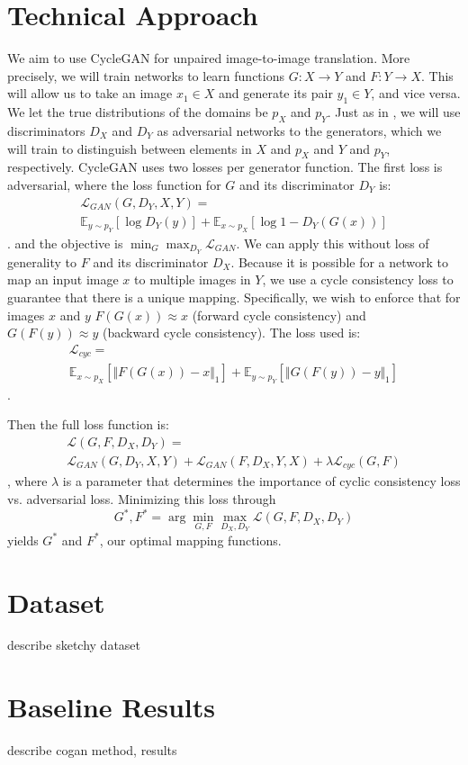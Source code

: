 \documentclass[10pt,twocolumn,letterpaper]{article}
\begin{document}
\section{Technical Approach}
We aim to use CycleGAN \cite{cycleGAN} for unpaired image-to-image translation.
More precisely, we will train networks to learn functions $G : X \rightarrow Y$ and $F: Y \rightarrow X$.
This will allow us to take an image $x_1 \in X$ and generate its pair $y_1 \in Y$, and vice versa.
We let the true distributions of the domains be $p_X$ and $p_Y$.
Just as in \cite{gan}, we will use discriminators $D_X$ and $D_Y$ as adversarial networks to the generators, which we will train to distinguish between elements in $X$ and $p_X$ and $Y$ and $p_Y$, respectively.
CycleGAN uses two losses per generator function.
The first loss is adversarial, where the loss function for $G$ and its discriminator $D_Y$ is:
\begin{multline}
\displaystyle \mathcal{L}_{GAN}(G, D_Y, X, Y) = \\
\mathbb{E}_{y \sim p_Y}[\log{D_Y(y)}]
+ \mathbb{E}_{x \sim p_X}[\log{1 - D_Y(G(x))}]
\end{multline}.
and the objective is $\displaystyle \min_{G} \max_{D_Y} \mathcal{L}_{GAN}$.
We can apply this without loss of generality to $F$ and its discriminator $D_X$.
Because it is possible for a network to map an input image $x$ to multiple images in $Y$, we use a cycle consistency loss to guarantee that there is a unique mapping.
Specifically, we wish to enforce that for images $x$ and $y$ $F(G(x)) \approx x$ (forward cycle consistency) and $G(F(y)) \approx y$ (backward cycle consistency).
The loss used is:
\begin{multline}
\displaystyle \mathcal{L}_{cyc} = \\
\mathbb{E}_{x \sim p_X}[\Vert{F(G(x)) - x}\Vert_1]
+ \mathbb{E}_{y \sim p_Y}[\Vert{G(F(y)) - y}\Vert_1]
\end{multline}.

Then the full loss function is:
\begin{multline}
\displaystyle \mathcal{L}(G, F, D_X, D_Y) = \\
\mathcal{L}_{GAN}(G, D_Y, X, Y)
+ \mathcal{L}_{GAN}(F, D_X, Y, X)
+ \lambda\mathcal{L}_{cyc}(G, F)
\end{multline},
where $\lambda$ is a parameter that determines the importance of cyclic consistency loss vs. adversarial loss.
Minimizing this loss through
\begin{equation}
\displaystyle G^*, F^* = \arg\min_{G, F}\max_{D_X, D_Y} \mathcal{L}(G, F, D_X, D_Y)
\end{equation}
yields $G^*$ and $F^*$, our optimal mapping functions.
\section{Dataset}
describe sketchy dataset

\section{Baseline Results}
describe cogan method, results

{\small


}
\end{document}
